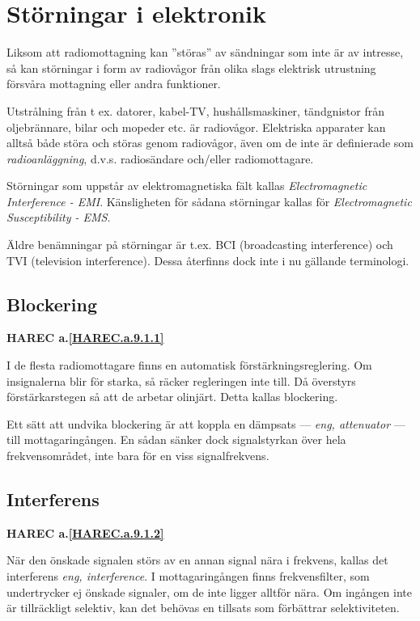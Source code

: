 \section{Störningar i elektronik}

Liksom att radiomottagning kan ''störas'' av sändningar som inte är av
intresse, så kan störningar i form av radiovågor från olika slags
elektrisk utrustning försvåra mottagning eller andra funktioner.

Utstrålning från t ex. datorer, kabel-TV, hushållsmaskiner,
tändgnistor från oljebrännare, bilar och mopeder etc. är radiovågor.
Elektriska apparater kan alltså både störa och störas genom
radiovågor, även om de inte är definierade som \emph{radioanläggning},
d.v.s. radiosändare och/eller radiomottagare.

Störningar som uppstår av elektromagnetiska fält kallas
\emph{Electromagnetic Interference - EMI}. Känsligheten för sådana
störningar kallas för \emph{Electromagnetic Susceptibility - EMS}.

Äldre benämningar på störningar är t.ex. BCI (broadcasting interference) och
TVI (television interference). Dessa återfinns dock inte i nu gällande
terminologi.

\subsection{Blockering}
\textbf{
HAREC a.\ref{HAREC.a.9.1.1}\label{myHAREC.a.9.1.1}
}

I de flesta radiomottagare finns en automatisk förstärkningsreglering. Om
insignalerna blir för starka, så räcker regleringen inte till. Då överstyrs 
förstärkarstegen så att de arbetar olinjärt. Detta kallas blockering.

Ett sätt att undvika blockering är att koppla en dämpsats --- \emph{eng,
attenuator} --- till mottagaringången. En sådan sänker dock signalstyrkan
över hela frekvensområdet, inte bara för en viss signalfrekvens.

\subsection{Interferens}
\textbf{
HAREC a.\ref{HAREC.a.9.1.2}\label{myHAREC.a.9.1.2}
}

När den önskade signalen störs av en annan signal nära i frekvens, kallas det
interferens \emph{eng, interference}. I mottagaringången finns frekvensfilter,
som undertrycker ej önskade signaler, om de inte ligger alltför nära. Om
ingången inte är tillräckligt selektiv, kan det behövas en tillsats som
förbättrar selektiviteten.

